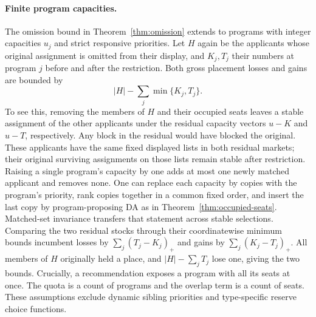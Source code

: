 \paragraph{Finite program capacities.}
The omission bound in Theorem~\ref{thm:omission} extends to programs with integer capacities $u_j$ and strict responsive priorities. Let $H$ again be the applicants whose original assignment is omitted from their display, and $K_j,T_j$ their numbers at program $j$ before and after the restriction. Both gross placement losses and gains are bounded by
\[
                         |H|-\sum_j\min\{K_j,T_j\}.
\]
To see this, removing the members of $H$ and their occupied seats leaves a stable assignment of the other applicants under the residual capacity vectors $u-K$ and $u-T$, respectively. Any block in the residual would have blocked the original. These applicants have the same fixed displayed lists in both residual markets; their original surviving assignments on those lists remain stable after restriction. Raising a single program's capacity by one adds at most one newly matched applicant and removes none. One can replace each capacity by copies with the program's priority, rank copies together in a common fixed order, and insert the last copy by program-proposing DA as in Theorem~\ref{thm:occupied-seats}. Matched-set invariance transfers that statement across stable selections. Comparing the two residual stocks through their coordinatewise minimum bounds incumbent losses by $\sum_j(T_j-K_j)_+$ and gains by $\sum_j(K_j-T_j)_+$. All members of $H$ originally held a place, and $|H|-\sum_jT_j$ lose one, giving the two bounds. Crucially, a recommendation exposes a program with all its seats at once. The quota is a count of programs and the overlap term is a count of seats. These assumptions exclude dynamic sibling priorities and type-specific reserve choice functions.

